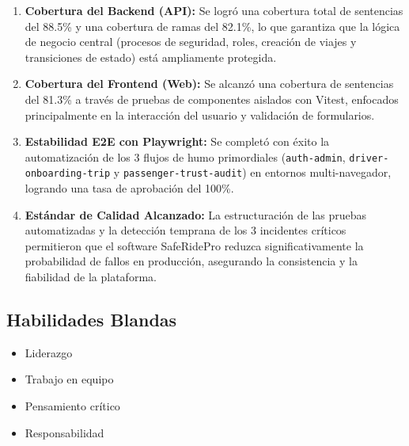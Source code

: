 \documentclass{article}
\newcommand{\checkedbox}{\stackinset{c}{0pt}{c}{0pt}{\checkmark}{$\square$}}
\begin{document}
\begin{enumerate}
    \item \textbf{Cobertura del Backend (API):} Se logró una cobertura total de sentencias del 88.5\% y una cobertura de ramas del 82.1\%, lo que garantiza que la lógica de negocio central (procesos de seguridad, roles, creación de viajes y transiciones de estado) está ampliamente protegida.
    \item \textbf{Cobertura del Frontend (Web):} Se alcanzó una cobertura de sentencias del 81.3\% a través de pruebas de componentes aislados con Vitest, enfocados principalmente en la interacción del usuario y validación de formularios.
    \item \textbf{Estabilidad E2E con Playwright:} Se completó con éxito la automatización de los 3 flujos de humo primordiales (\texttt{auth-admin}, \texttt{driver-onboarding-trip} y \texttt{passenger-trust-audit}) en entornos multi-navegador, logrando una tasa de aprobación del 100\%.
    \item \textbf{Estándar de Calidad Alcanzado:} La estructuración de las pruebas automatizadas y la detección temprana de los 3 incidentes críticos permitieron que el software SafeRidePro reduzca significativamente la probabilidad de fallos en producción, asegurando la consistencia y la fiabilidad de la plataforma.
\end{enumerate}

\subsection{Habilidades Blandas}
\begin{itemize}
    \item[\checkedbox] Liderazgo
    \item[\checkedbox] Trabajo en equipo
    \item[\checkedbox] Pensamiento crítico
    \item[\checkedbox] Responsabilidad
\end{itemize}
\end{document}

